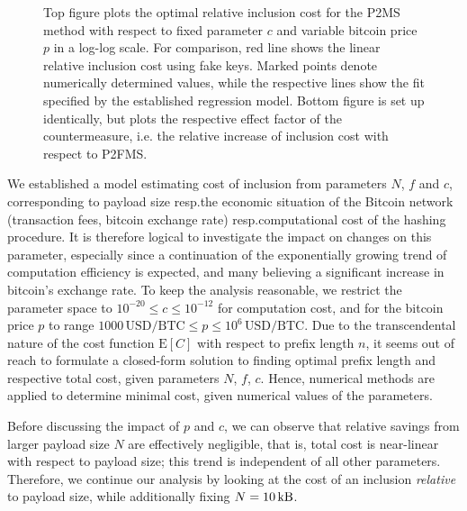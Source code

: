 \documentclass[a4paper,11pt,titlepage]{scrbook}
\begin{document}
\begin{figure}[p]
    \caption[Optimal relative inclusion cost with respect to arbitrary parameters $c$ and bitcoin price $p$]{Top figure plots the optimal relative inclusion cost for the P2MS method with respect to fixed parameter $c$ and variable bitcoin price $p$ in a log-log scale. For comparison, red line shows the linear relative inclusion cost using fake keys.
    Marked points denote numerically determined values, while the respective lines show the fit specified by the established regression model. Bottom figure is set up identically, but plots the respective effect factor of the countermeasure, i.e. the relative increase of inclusion cost with respect to P2FMS.}
\end{figure}

We established a model estimating cost of inclusion from parameters $N$, $f$ and $c$, corresponding to payload size resp.\@ the economic situation of the Bitcoin network (transaction fees, bitcoin exchange rate) resp.\@ computational cost of the hashing procedure.
It is therefore logical to investigate the impact on changes on this parameter, especially since a continuation of the exponentially growing trend of computation efficiency is expected, and many believing a significant increase in bitcoin's exchange rate.
To keep the analysis reasonable, we restrict the parameter space to $10^{-20} \leq c \leq 10^{-12}$ for computation cost, and for the bitcoin price $p$ to range $\SI{1000}\,\text{USD}/\text{BTC} \leq p \leq 10^6\,\text{USD}/\text{BTC}$.
Due to the transcendental nature of the cost function $\mathrm{E}[C]$ with respect to prefix length $n$, it seems out of reach to formulate a closed-form solution to finding optimal prefix length and respective total cost, given parameters $N$, $f$, $c$.
Hence, numerical methods are applied to determine minimal cost, given numerical values of the parameters.

Before discussing the impact of $p$ and $c$, we can observe that relative savings from larger payload size $N$ are effectively negligible, that is, total cost is near-linear with respect to payload size;
this trend is independent of all other parameters.
Therefore, we continue our analysis by looking at the cost of an inclusion \emph{relative} to payload size, while additionally fixing $N=\SI{10}{\kilo\byte}$.
\end{document}
